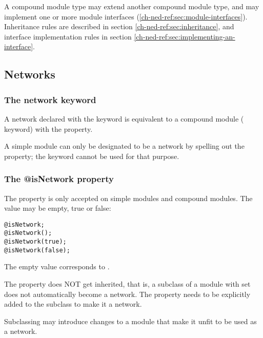 A compound module type may extend another compound module type, and
may implement one or more module interfaces (\ref{ch-ned-ref:sec:module-interfaces}).
Inheritance rules are described in section \ref{ch-ned-ref:sec:inheritance},
and interface implementation rules in section \ref{ch-ned-ref:sec:implementing-an-interface}.



\subsection{Networks}
\label{ch-ned-ref:sec:networks}

\subsubsection{The network keyword}

A network declared with the  keyword is equivalent to a compound
module ( keyword) with the  property.

\begin{note}
    A simple module can only be designated to be a network by spelling out the
     property; the  keyword cannot
    be used for that purpose.
\end{note}

\subsubsection{The @isNetwork property}

The  property is only accepted on simple modules and
compound modules. The value may be empty, true or false:

\begin{verbatim}
@isNetwork;
@isNetwork();
@isNetwork(true);
@isNetwork(false);
\end{verbatim}

The empty value corresponds to .

The  property does NOT get inherited, that is, a subclass
of a module with  set does not automatically become a network.
The  property needs to be explicitly added to the subclass
to make it a network.

\begin{rationale}
    Subclassing may introduce changes to a module that make it unfit to be used
    as a network.
\end{rationale}



